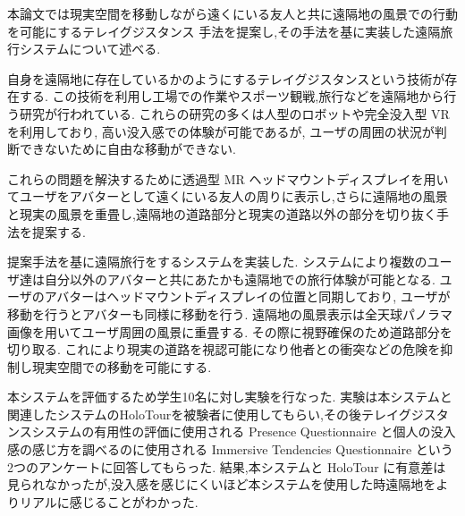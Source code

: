 本論文では現実空間を移動しながら遠くにいる友人と共に遠隔地の風景での行動を可能にするテレイグジスタンス 手法を提案し,その手法を基に実装した遠隔旅行システムについて述べる.

自身を遠隔地に存在しているかのようにするテレイグジスタンスという技術が存在する. この技術を利用し工場での作業やスポーツ観戦,旅行などを遠隔地から行う研究が行われている. これらの研究の多くは人型のロボットや完全没入型 VR を利用しており, 高い没入感での体験が可能であるが, ユーザの周囲の状況が判断できないために自由な移動ができない. 

これらの問題を解決するために透過型 MR ヘッドマウントディスプレイを用いてユーザをアバターとして遠くにいる友人の周りに表示し,さらに遠隔地の風景と現実の風景を重畳し,遠隔地の道路部分と現実の道路以外の部分を切り抜く手法を提案する. 

提案手法を基に遠隔旅行をするシステムを実装した.
システムにより複数のユーザ達は自分以外のアバターと共にあたかも遠隔地での旅行体験が可能となる. ユーザのアバターはヘッドマウントディスプレイの位置と同期しており, ユーザが移動を行うとアバターも同様に移動を行う. 遠隔地の風景表示は全天球パノラマ画像を用いてユーザ周囲の風景に重畳する. その際に視野確保のため道路部分を切り取る. これにより現実の道路を視認可能になり他者との衝突などの危険を抑制し現実空間での移動を可能にする.

本システムを評価するため学生10名に対し実験を行なった.
実験は本システムと関連したシステムのHoloTourを被験者に使用してもらい,その後テレイグジスタンスシステムの有用性の評価に使用される Presence Questionnaire と個人の没入感の感じ方を調べるのに使用される Immersive Tendencies Questionnaire という2つのアンケートに回答してもらった.
結果,本システムと HoloTour に有意差は見られなかったが,没入感を感じにくいほど本システムを使用した時遠隔地をよりリアルに感じることがわかった.　